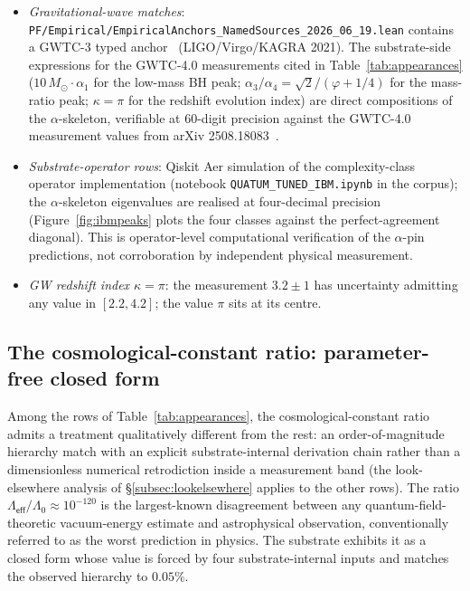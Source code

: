 \documentclass[11pt,a4paper]{amsart}
\theoremstyle{plain}
\theoremstyle{definition}
\begin{document}
\begin{itemize}[itemsep=2pt]
\item \emph{Gravitational-wave matches}: \texttt{PF/Empirical/EmpiricalAnchors\_NamedSources\_2026\_06\_19.lean} contains a GWTC-3 typed anchor~\cite{gwtc3} (LIGO/Virgo/KAGRA 2021). The substrate-side expressions for the GWTC-4.0 measurements cited in Table~\ref{tab:appearances} ($10\,M_\odot\cdot\alpha_1$ for the low-mass BH peak; $\alpha_3/\alpha_4 = \sqrt{2}/(\varphi+1/4)$ for the mass-ratio peak; $\kappa = \pi$ for the redshift evolution index) are direct compositions of the $\alpha$-skeleton, verifiable at 60-digit precision against the GWTC-4.0 measurement values from arXiv 2508.18083~\cite{gwtc4}.
\item \emph{Substrate-operator rows}: Qiskit Aer simulation of the complexity-class operator implementation (notebook \texttt{QUATUM\_TUNED\_IBM.ipynb} in the corpus); the $\alpha$-skeleton eigenvalues are realised at four-decimal precision (Figure~\ref{fig:ibmpeaks} plots the four classes against the perfect-agreement diagonal). This is operator-level computational verification of the $\alpha$-pin predictions, not corroboration by independent physical measurement.
\item \emph{GW redshift index $\kappa = \pi$}: the measurement $3.2 \pm 1$ has uncertainty admitting any value in $[2.2, 4.2]$; the value $\pi$ sits at its centre.
\end{itemize}

\subsection{The cosmological-constant ratio: parameter-free closed form}\label{subsec:lambdaeff}

Among the rows of Table~\ref{tab:appearances}, the cosmological-constant ratio admits a treatment qualitatively different from the rest: an order-of-magnitude hierarchy match with an explicit substrate-internal derivation chain rather than a dimensionless numerical retrodiction inside a measurement band (the look-elsewhere analysis of \S\ref{subsec:lookelsewhere} applies to the other rows). The ratio $\Lambda_{\textsf{eff}}/\Lambda_0 \approx 10^{-120}$ is the largest-known disagreement between any quantum-field-theoretic vacuum-energy estimate and astrophysical observation, conventionally referred to as the worst prediction in physics. The substrate exhibits it as a closed form whose value is forced by four substrate-internal inputs and matches the observed hierarchy to $0.05\%$.
\end{document}
